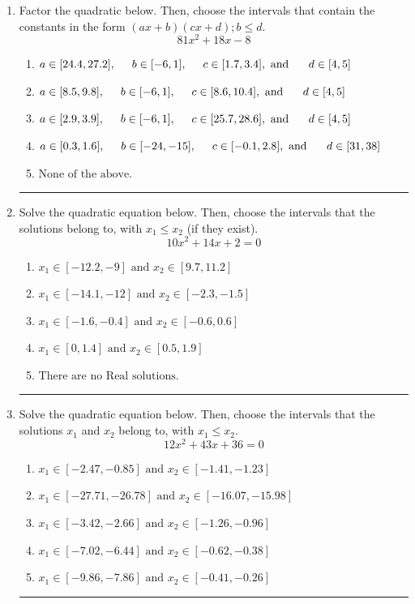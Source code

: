 \documentclass[14pt]{extbook}
\newcommand{\litem}[1]{\item#1\hspace*{-1cm}\rule{\textwidth}{0.4pt}}
\begin{document}
\begin{enumerate}
{\begin{enumerate}[label=\Alph*.]
\end{enumerate} }
\litem{
Factor the quadratic below. Then, choose the intervals that contain the constants in the form $(ax+b)(cx+d); b \leq d.$\[ 81x^{2} +18 x -8 \]\begin{enumerate}[label=\Alph*.]
\item \( a \in [24.4, 27.2], \hspace*{5mm} b \in [-6, 1], \hspace*{5mm} c \in [1.7, 3.4], \text{ and } \hspace*{5mm} d \in [4, 5] \)
\item \( a \in [8.5, 9.8], \hspace*{5mm} b \in [-6, 1], \hspace*{5mm} c \in [8.6, 10.4], \text{ and } \hspace*{5mm} d \in [4, 5] \)
\item \( a \in [2.9, 3.9], \hspace*{5mm} b \in [-6, 1], \hspace*{5mm} c \in [25.7, 28.6], \text{ and } \hspace*{5mm} d \in [4, 5] \)
\item \( a \in [0.3, 1.6], \hspace*{5mm} b \in [-24, -15], \hspace*{5mm} c \in [-0.1, 2.8], \text{ and } \hspace*{5mm} d \in [31, 38] \)
\item \( \text{None of the above.} \)

\end{enumerate} }
\litem{
Solve the quadratic equation below. Then, choose the intervals that the solutions belong to, with $x_1 \leq x_2$ (if they exist).\[ 10x^{2} +14 x + 2 = 0 \]\begin{enumerate}[label=\Alph*.]
\item \( x_1 \in [-12.2, -9] \text{ and } x_2 \in [9.7, 11.2] \)
\item \( x_1 \in [-14.1, -12] \text{ and } x_2 \in [-2.3, -1.5] \)
\item \( x_1 \in [-1.6, -0.4] \text{ and } x_2 \in [-0.6, 0.6] \)
\item \( x_1 \in [0, 1.4] \text{ and } x_2 \in [0.5, 1.9] \)
\item \( \text{There are no Real solutions.} \)

\end{enumerate} }
\litem{
Solve the quadratic equation below. Then, choose the intervals that the solutions $x_1$ and $x_2$ belong to, with $x_1 \leq x_2$.\[ 12x^{2} +43 x + 36 = 0 \]\begin{enumerate}[label=\Alph*.]
\item \( x_1 \in [-2.47, -0.85] \text{ and } x_2 \in [-1.41, -1.23] \)
\item \( x_1 \in [-27.71, -26.78] \text{ and } x_2 \in [-16.07, -15.98] \)
\item \( x_1 \in [-3.42, -2.66] \text{ and } x_2 \in [-1.26, -0.96] \)
\item \( x_1 \in [-7.02, -6.44] \text{ and } x_2 \in [-0.62, -0.38] \)
\item \( x_1 \in [-9.86, -7.86] \text{ and } x_2 \in [-0.41, -0.26] \)


\end{enumerate}}
\end{enumerate}
\end{document}
